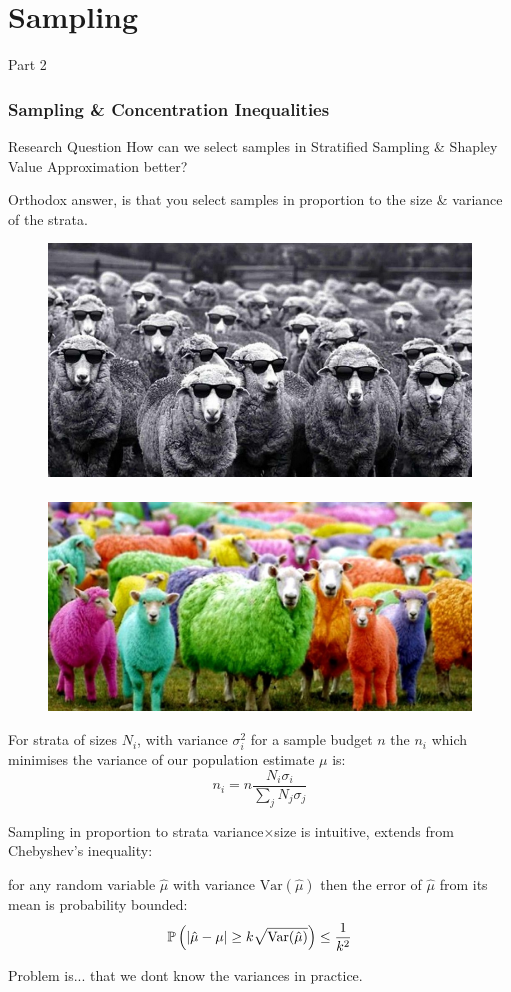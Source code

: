 

\section{Sampling}


\begin{frame}
\Huge{\centerline{Part 2}}
\end{frame}

\begin{frame}
\frametitle{Sampling \& Concentration Inequalities}
\begin{block}{Research Question}
How can we select samples in Stratified Sampling \& Shapley Value Approximation better?
\end{block}
Orthodox answer, is that you select samples in proportion to the size \& variance of the strata.
\begin{figure}
\includegraphics[width=0.45\linewidth,height=0.25\linewidth]{figs/sheep.png}%
$~~~~~$
\includegraphics[width=0.45\linewidth,height=0.25\linewidth]{figs/sheep2.jpg}%
\end{figure}
\end{frame}


\begin{frame}
\begin{theorem}\label{thm:neyman_selection}
For strata of sizes $N_i$, with variance $\sigma_i^2$ for a sample budget $n$ the $n_i$ which minimises the variance of our population estimate $\mu$ is:
$$n_i = n\frac{N_i\sigma_i}{\sum_jN_j\sigma_j}$$
\end{theorem}
Sampling in proportion to strata variance$\times$size is intuitive, extends from Chebyshev's inequality:
\begin{theorem}\label{thm:chebyshevs}
for any random variable $\hat{\mu}$ with variance $\text{Var}(\hat{\mu})$ then the error of $\hat{\mu}$ from its mean is probability bounded:
$$ \operatorname{\mathbb{P}}\left(|\hat{\mu}-\mu|\ge k\sqrt{\text{Var}(\hat{\mu})}\right)\le\frac{1}{k^2} $$
\end{theorem}
Problem is... that we dont know the variances in practice.
\end{frame}


